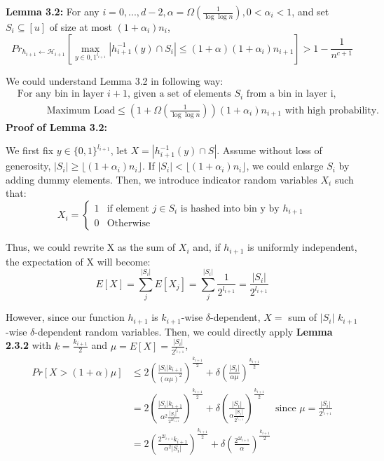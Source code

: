 \documentclass[a4paper, english]{paper}
\begin{document}
	\noindent\textbf{Lemma 3.2:} For any $i = {0,...,d-2},\alpha = \Omega(\frac1{\log\log n}), 0<\alpha_i<1$, and set $S_i\subseteq[u]$ of size at most $(1+\alpha_i)n_i$,
	$${Pr}_{h_{i+1}\leftarrow \mathscr{H}_{i+1}}\left[\max_{y\in{0,1}^{l_{i+1}}}|h_{i+1}^{-1}(y) \cap S_i|\le(1+\alpha)(1+\alpha_i)n_{i+1}\right]> 1-\frac1{n^{c+1}}$$\par
	We could understand Lemma 3.2 in following way:
	\begin{align*}
	&\text{For any bin in layer $i+1$, given a set of elements $S_i$ from a bin in layer i,}\\
	&\qquad\quad \text{Maximum Load} \le \left(1+\Omega(\frac1 {\log\log n})\right)(1+\alpha_i)n_{i+1} \text{ with high probability.}
	\end{align*}
	\noindent\textbf{Proof of Lemma 3.2:} \par
	\noindent We first fix $y\in\{0,1\}^{l_{i+1}}$, let $X=|h_{i+1}^{-1}(y)\cap S|$. Assume without loss of generosity, $|S_i|\ge \lfloor (1+\alpha_i)n_i\rfloor$. If $|S_i|< \lfloor (1+\alpha_i)n_i\rfloor$, we could enlarge $S_i$ by adding dummy elements. Then, we introduce indicator random variables $X_i$ such that:
\[ X_i=\begin{cases} 
      1 & \text{if element }j\in S_i\text{ is hashed into bin y by }h_{i+1} \\
      0 & \text{Otherwise}
   \end{cases}
\]\par
	Thus, we could rewrite X as the sum of $X_i$ and, if $h_{i+1}$ is uniformly independent, the expectation of X will become:
	$$E[X] = \sum_j^{|S_i|}E[X_j]=\sum_j^{|S_i|}\frac1{2^{l_{i+1}}} = \frac{|S_i|}{2^{l_{i+1}}}$$\par
	However, since our function $h_{i+1}$ is $k_{i+1}$-wise $\delta$-dependent, $X=$ sum of $|S_i|$ $k_{i+1}$-wise $\delta$-dependent random variables. Then, we could directly apply \textbf{Lemma 2.3.2} with $k = \frac{k_{i+1}}2$ and $\mu =E[X]=\frac{|S_i|}{2^{l_{i+1}}}$,
	\begin{align*}
	Pr[X>(1+\alpha)\mu] &\le 2\left(\frac{|S_i|k_{i+1}}{(\alpha\mu)^2}\right)^{\frac{k_{i+1}}2}+\delta\left( \frac{|S_i|}{\alpha\mu}\right)^{\frac{k_{i+1}}2}\\
	&= 2\left(\frac{|S_i|k_{i+1}}{\alpha^2 \frac{|S_i|^2}{2^{2l_{i+1}}}}\right)^{\frac{k_{i+1}}2} +\delta\left( \frac{|S_i|}{\alpha\frac{|S_i|}{2^{l_{i+1}}}}\right)^{\frac{k_{i+1}}2}\quad\text{since }\mu =\frac{|S_i|}{2^{l_{i+1}}}\\
	&= 2\left(\frac{2^{2l_{i+1}}k_{i+1}}{\alpha^2 |S_i|}\right)^{\frac{k_{i+1}}2} +\delta\left( \frac{2^{2l_{i+1}}}{\alpha}\right)^{\frac{k_{i+1}}2}
	\end{align*}\par
\end{document}
